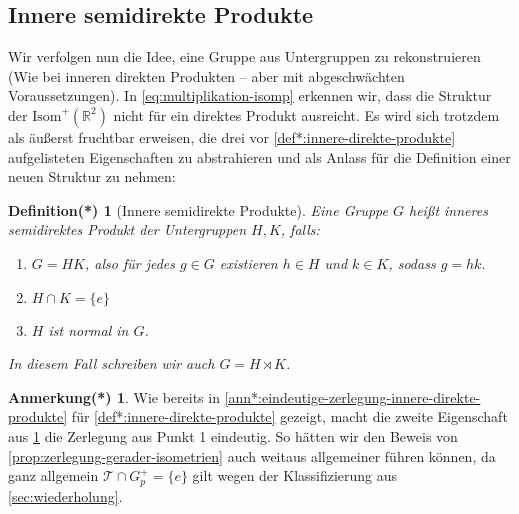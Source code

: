 \documentclass[a4paper, ngerman]{article}
\newcounter{chapter}
\numberwithin{equation}{chapter}
\theoremstyle{plain}
\newtheorem{definitionstrd}{Definition(*)}[chapter]
\theoremstyle{definition}
\newtheorem{annotationstrd}{Anmerkung(*)}[chapter]
\newcommand{\anm}[1]{{\color{red} #1}}
\begin{document}
\subsection{Innere semidirekte Produkte}\label{subsec:innere-semidirekte-produkte}
Wir verfolgen nun die Idee, eine Gruppe aus Untergruppen zu rekonstruieren (Wie bei inneren direkten Produkten -- aber mit abgeschwächten Voraussetzungen). In \eqref{eq:multiplikation-isomp} erkennen wir, dass die Struktur der \(\mathrm{Isom}^+(\mathbb R^2)\) nicht für ein direktes Produkt ausreicht. Es wird sich trotzdem als äußerst fruchtbar erweisen, die drei vor \cref{def*:innere-direkte-produkte} aufgelisteten Eigenschaften zu abstrahieren und als Anlass für die Definition einer neuen Struktur zu nehmen:

\begin{definitionstrd}[Innere semidirekte Produkte]\label{def*:innere-semidirekte-produkte}
    Eine Gruppe \(G\) heißt \emph{inneres semidirektes Produkt} der Untergruppen \(H, K\), falls: 
    \begin{enumerate}
        \item \(G = HK\), also für jedes \(g \in G\) existieren \(h \in H\) und \(k \in K\), sodass \(g = hk\). %
        \item \(H\cap K = \{e\}\) %
    
        \item \(H\) ist normal in \(G\). 
    \end{enumerate}
    In diesem Fall schreiben wir auch \(G = H \rtimes K\). 
\end{definitionstrd}
\begin{annotationstrd}
    Wie bereits in \cref{ann*:eindeutige-zerlegung-innere-direkte-produkte} für \cref{def*:innere-direkte-produkte} gezeigt, macht die zweite Eigenschaft aus \cref{def*:innere-semidirekte-produkte} die Zerlegung aus Punkt 1 eindeutig. So hätten wir den Beweis von \cref{prop:zerlegung-gerader-isometrien} auch weitaus allgemeiner führen können, da ganz allgemein \(\mathcal T \cap G_p^+ = \{e\}\) gilt wegen der Klassifizierung aus \cref{sec:wiederholung}.  
\end{annotationstrd}
\end{document}
